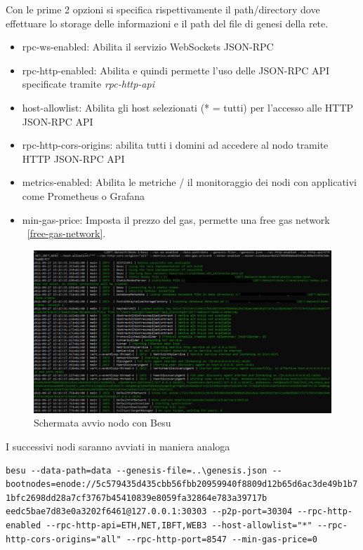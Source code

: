 \documentclass[11pt,a4paper,titlepage,twoside,openright]{report}
\begin{document}
Con le prime 2 opzioni si specifica rispettivamente il path/directory dove effettuare lo storage delle informazioni e il path del file di genesi della rete. 
\begin{itemize}
\item rpc-ws-enabled: Abilita il servizio WebSockets JSON-RPC
\item rpc-http-enabled: Abilita e quindi permette l'uso delle JSON-RPC API specificate tramite \textit{rpc-http-api}
\item host-allowlist: Abilita gli host selezionati (* = tutti) per l'accesso alle HTTP JSON-RPC API
\item rpc-http-cors-origins: abilita tutti i domini ad accedere al nodo tramite HTTP JSON-RPC API
\item metrics-enabled: Abilita le metriche / il monitoraggio dei nodi con applicativi come Prometheus o Grafana
\item min-gas-price: Imposta il prezzo del gas, permette una free gas network ~\ref{free-gas-network}.
\end{itemize}

\begin{figure}[h]
	\includegraphics[width=\textwidth]{Besu-avvio}
	\centering
	\caption{Schermata avvio nodo con Besu}
	\label{fig:sch-avvio-besu}
\end{figure}

I successivi nodi saranno avviati in maniera analoga
\begin{lstlisting}[language=command.com]
besu --data-path=data --genesis-file=..\genesis.json --bootnodes=enode://5c579435d435cbb56fbb20959940f8809d12b65d6ac3de49b1b7 1bfc2698dd28a7cf3767b45410839e8059fa32864e783a39717b eedc5bae7d83e0a3202f6461@127.0.0.1:30303 --p2p-port=30304 --rpc-http-enabled --rpc-http-api=ETH,NET,IBFT,WEB3 --host-allowlist="*" --rpc-http-cors-origins="all" --rpc-http-port=8547 --min-gas-price=0
\end{lstlisting}
\end{document}
